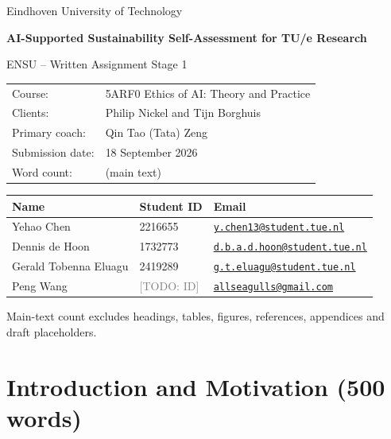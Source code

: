 \documentclass[11pt,a4paper]{article}
\newcommand{\placeholder}[1]{\textcolor{gray}{[TODO: #1]}}
\begin{document}
\hypersetup{pageanchor=false}
\begin{titlepage}
\centering
\vspace*{3cm}
{\Large Eindhoven University of Technology\par}
\vspace{1.5cm}
{\huge\bfseries AI-Supported Sustainability Self-Assessment for TU/e Research\par}
\vspace{0.6cm}
{\Large ENSU -- Written Assignment Stage 1\par}
\vfill
\begin{tabularx}{0.95\textwidth}{@{}lX@{}}
Course: & 5ARF0 Ethics of AI: Theory and Practice \\
Clients: & Philip Nickel and Tijn Borghuis \\
Primary coach: & Qin Tao (Tata) Zeng \\
Submission date: & 18 September 2026 \\
Word count: & \mainwordcount{} (main text)
\end{tabularx}

\vspace{1cm}
\begin{tabularx}{0.95\textwidth}{@{}p{}p{}X@{}}
\toprule
Name & Student ID & Email \\
\midrule
Yehao Chen & 2216655 & \href{mailto:y.chen13@student.tue.nl}{\nolinkurl{y.chen13@student.tue.nl}} \\
Dennis de Hoon & 1732773 & \href{mailto:d.b.a.d.hoon@student.tue.nl}{\nolinkurl{d.b.a.d.hoon@student.tue.nl}} \\
Gerald Tobenna Eluagu & 2419289 & \href{mailto:g.t.eluagu@student.tue.nl}{\nolinkurl{g.t.eluagu@student.tue.nl}} \\
Peng Wang & \placeholder{ID} & \href{mailto:allseagulls@gmail.com}{\nolinkurl{allseagulls@gmail.com}} \\
\bottomrule
\end{tabularx}

\vspace{0.6cm}
{\footnotesize Main-text count excludes headings, tables, figures, references, appendices and draft placeholders.\par}

\vfill
\end{titlepage}
\hypersetup{pageanchor=true}

\section{Introduction and Motivation (500 words)}
\end{document}

